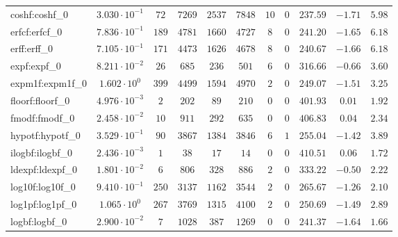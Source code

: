 \begin{tabular}{|l|c|c|c|c|c|c|c|c|c|c|}
coshf:coshf\_0               & $ 3.030 \cdot 10^{-1} $ & $ 72     $ & $ 7269   $ & $ 2537  $ & $ 7848   $ & $ 10  $ & $ 0 $ & $ 237.59      $ & $ -1.71   $ & $ 5.98    $ \\
erfcf:erfcf\_0               & $ 7.836 \cdot 10^{-1} $ & $ 189    $ & $ 4781   $ & $ 1660  $ & $ 4727   $ & $ 8   $ & $ 0 $ & $ 241.20      $ & $ -1.65   $ & $ 6.18    $ \\
erff:erff\_0                 & $ 7.105 \cdot 10^{-1} $ & $ 171    $ & $ 4473   $ & $ 1626  $ & $ 4678   $ & $ 8   $ & $ 0 $ & $ 240.67      $ & $ -1.66   $ & $ 6.18    $ \\
expf:expf\_0                 & $ 8.211 \cdot 10^{-2} $ & $ 26     $ & $ 685    $ & $ 236   $ & $ 501    $ & $ 6   $ & $ 0 $ & $ 316.66      $ & $ -0.66   $ & $ 3.60    $ \\
expm1f:expm1f\_0             & $ 1.602 \cdot 10^{0}  $ & $ 399    $ & $ 4499   $ & $ 1594  $ & $ 4970   $ & $ 2   $ & $ 0 $ & $ 249.07      $ & $ -1.51   $ & $ 3.25    $ \\
floorf:floorf\_0             & $ 4.976 \cdot 10^{-3} $ & $ 2      $ & $ 202    $ & $ 89    $ & $ 210    $ & $ 0   $ & $ 0 $ & $ 401.93      $ & $ 0.01    $ & $ 1.92    $ \\
fmodf:fmodf\_0               & $ 2.458 \cdot 10^{-2} $ & $ 10     $ & $ 911    $ & $ 292   $ & $ 635    $ & $ 0   $ & $ 0 $ & $ 406.83      $ & $ 0.04    $ & $ 2.34    $ \\
hypotf:hypotf\_0             & $ 3.529 \cdot 10^{-1} $ & $ 90     $ & $ 3867   $ & $ 1384  $ & $ 3846   $ & $ 6   $ & $ 1 $ & $ 255.04      $ & $ -1.42   $ & $ 3.89    $ \\
ilogbf:ilogbf\_0             & $ 2.436 \cdot 10^{-3} $ & $ 1      $ & $ 38     $ & $ 17    $ & $ 14     $ & $ 0   $ & $ 0 $ & $ 410.51      $ & $ 0.06    $ & $ 1.72    $ \\
ldexpf:ldexpf\_0             & $ 1.801 \cdot 10^{-2} $ & $ 6      $ & $ 806    $ & $ 328   $ & $ 886    $ & $ 2   $ & $ 0 $ & $ 333.22      $ & $ -0.50   $ & $ 2.22    $ \\
log10f:log10f\_0             & $ 9.410 \cdot 10^{-1} $ & $ 250    $ & $ 3137   $ & $ 1162  $ & $ 3544   $ & $ 2   $ & $ 0 $ & $ 265.67      $ & $ -1.26   $ & $ 2.10    $ \\
log1pf:log1pf\_0             & $ 1.065 \cdot 10^{0}  $ & $ 267    $ & $ 3769   $ & $ 1315  $ & $ 4100   $ & $ 2   $ & $ 0 $ & $ 250.69      $ & $ -1.49   $ & $ 2.89    $ \\
logbf:logbf\_0               & $ 2.900 \cdot 10^{-2} $ & $ 7      $ & $ 1028   $ & $ 387   $ & $ 1269   $ & $ 0   $ & $ 0 $ & $ 241.37      $ & $ -1.64   $ & $ 1.66    $ \\

\end{tabular}
